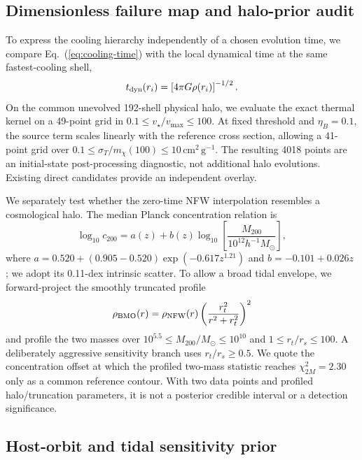 \documentclass[12pt]{iopart}
\newcommand{\Msun}{M_\odot}
\newcommand{\sigmavm}{\sigma_T/m_\chi}
\newcommand{\vstar}{v_\star}
\newcommand{\tdyn}{t_{\rm dyn}}
\begin{document}
\subsection{Dimensionless failure map and halo-prior audit}

To express the cooling hierarchy independently of a chosen evolution time,
we compare Eq.~(\ref{eq:cooling-time}) with the local dynamical time at the
same fastest-cooling shell,
\begin{equation}
  \tdyn(r_i)=\left[4\pi G\rho(r_i)\right]^{-1/2}.
  \label{eq:dynamical-time}
\end{equation}
On the common unevolved 192-shell physical halo, we evaluate the exact thermal
kernel on a 49-point grid in $0.1\leq\vstar/v_{\max}\leq100$.  At fixed
threshold and $\eta_B=0.1$, the source term scales linearly with the reference
cross section, allowing a 41-point grid over
$0.1\leq\sigmavm(100)\leq10\,\mathrm{cm^2\,g^{-1}}$.  The resulting 4018
points are an initial-state post-processing diagnostic, not additional halo
evolutions.  Existing direct candidates provide an independent overlay.

We separately test whether the zero-time NFW interpolation resembles a
cosmological halo.  The median Planck concentration relation is
\begin{equation}
 \log_{10}c_{200}=a(z)+b(z)\log_{10}\!\left[
 \frac{M_{200}}{10^{12}h^{-1}\Msun}\right],
 \label{eq:concentration-relation}
\end{equation}
where $a=0.520+(0.905-0.520)\exp(-0.617z^{1.21})$ and
$b=-0.101+0.026z$ \citep{DuttonMaccio2014}; we adopt its 0.11-dex intrinsic
scatter.  To allow a broad tidal envelope, we forward-project the smoothly
truncated profile
\begin{equation}
 \rho_{\rm BMO}(r)=\rho_{\rm NFW}(r)
 \left(\frac{r_t^2}{r^2+r_t^2}\right)^2
 \label{eq:bmo-profile}
\end{equation}
\citep{Baltz2009} and profile the two masses over
$10^{5.5}\leq M_{200}/\Msun\leq10^{10}$ and
$1\leq r_t/r_s\leq100$.  A deliberately aggressive sensitivity branch uses
$r_t/r_s\geq0.5$.  We quote the concentration offset at which the profiled
two-mass statistic reaches $\chi^2_{2M}=2.30$ only as a common reference
contour.  With two data points and profiled halo/truncation parameters, it is
not a posterior credible interval or a detection significance.

\subsection{Host-orbit and tidal sensitivity prior}
\label{sec:host-orbit-method}
\end{document}
